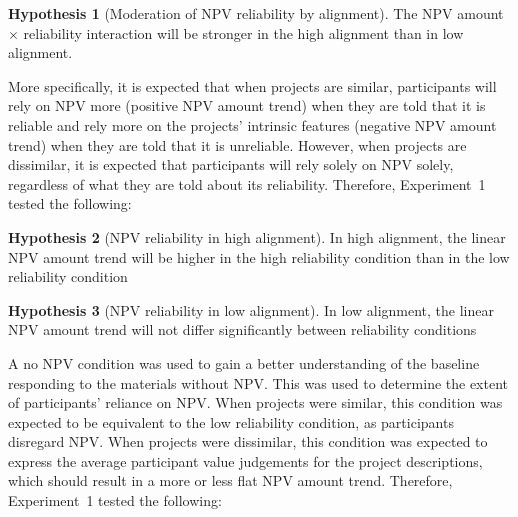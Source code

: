 \documentclass[a4paper, nobind, dvipsnames]{templates/ociamthesis}
\theoremstyle{definition}
\theoremstyle{definition}
\theoremstyle{definition}
\theoremstyle{definition}
\newtheorem{hypothesis}{Hypothesis}[chapter]
\theoremstyle{remark}
\begin{document}
\begin{hypothesis}[Moderation of NPV reliability by alignment]
\protect\hypertarget{hyp:allocation-alignment-reliability-npv-alignment-2}{}{\label{hyp:allocation-alignment-reliability-npv-alignment-2} {} }The NPV amount \(\times\) reliability interaction will be stronger in the high
alignment than in low alignment.
\end{hypothesis}

More specifically, it is expected that when projects are similar, participants
will rely on NPV more (positive NPV amount trend) when they are told that it is
reliable and rely more on the projects' intrinsic features (negative NPV amount
trend) when they are told that it is unreliable. However, when projects are
dissimilar, it is expected that participants will rely solely on NPV solely,
regardless of what they are told about its reliability. Therefore, Experiment~1
tested the following:

\begin{hypothesis}[NPV reliability in high alignment]
\protect\hypertarget{hyp:allocation-alignment-high-alignment-2}{}{\label{hyp:allocation-alignment-high-alignment-2} {} }In high alignment, the linear NPV amount trend will be higher in
the high reliability condition than in the low reliability condition
\end{hypothesis}

\begin{hypothesis}[NPV reliability in low alignment]
\protect\hypertarget{hyp:allocation-alignment-low-alignment-2}{}{\label{hyp:allocation-alignment-low-alignment-2} {} }In low alignment, the linear NPV amount trend will not differ
significantly between reliability conditions
\end{hypothesis}

A no NPV condition was used to gain a better understanding of the baseline
responding to the materials without NPV. This was used to determine the extent
of participants' reliance on NPV. When projects were similar, this condition was
expected to be equivalent to the low reliability condition, as participants
disregard NPV. When projects were dissimilar, this condition was expected to
express the average participant value judgements for the project descriptions,
which should result in a more or less flat NPV amount trend. Therefore,
Experiment~1 tested the following:
\end{document}
